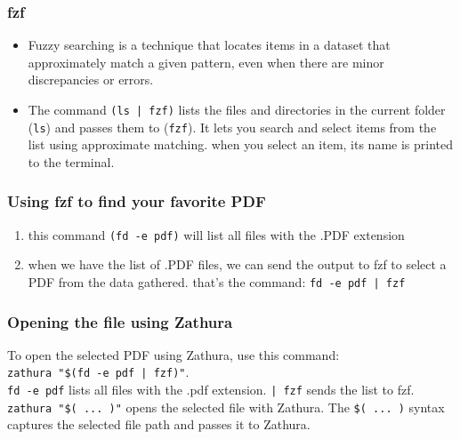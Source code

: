 \documentclass{article}
\begin{document}
        \subsubsection{fzf}
        \begin{itemize}
            \item Fuzzy searching is a technique that locates items in a dataset that approximately match a given pattern, even when there are minor discrepancies or errors.
            \item The command \texttt{(ls | fzf)} lists the files and directories in the current folder (\texttt{ls}) and passes them to (\texttt{fzf}). It lets you search and select items from the list using approximate matching. when you select an item, its name is printed to the terminal.
        \end{itemize}
        \subsubsection{Using fzf to find your favorite PDF}
        \begin{enumerate}
            \item this command \texttt{(fd -e pdf)} will list all files with the .PDF extension
            \item when we have the list of .PDF files, we can send the output to fzf to select a PDF from the data gathered. that’s the command: \texttt{fd -e pdf | fzf}
        \end{enumerate}
        \subsubsection{Opening the file using Zathura}
        To open the selected PDF using Zathura, use this command:\\ 
        \texttt{zathura "\$(fd -e pdf | fzf)"}.
        \\\texttt{fd -e pdf} lists all files with the .pdf extension. \texttt{| fzf} sends the list to fzf. \texttt{zathura "\$( ... )"} 
         opens the selected file with Zathura. The \texttt{\$( ... )} syntax captures the selected file path and passes it to Zathura.
        
\end{document}
